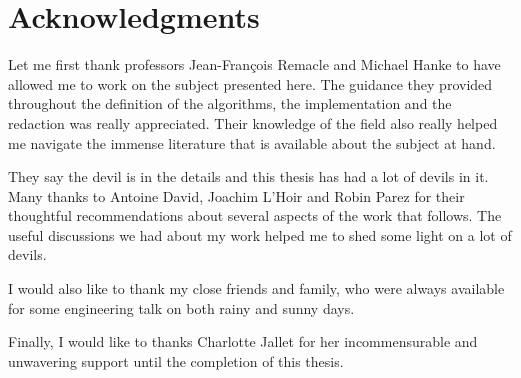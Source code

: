 \chapter*{Acknowledgments}

Let me first thank professors Jean-François Remacle and Michael Hanke to have allowed me to work on the subject presented here. The guidance they provided throughout the definition of the algorithms, the implementation and the redaction was really appreciated. Their knowledge of the field also really helped me navigate the immense literature that is available about the subject at hand. 


They say the devil is in the details and this thesis has had a lot of devils in it. Many thanks to Antoine David, Joachim L'Hoir and Robin Parez for their thoughtful recommendations about several aspects of the work that follows. The useful discussions we had about my work helped me to shed some light on a lot of devils.   

I would also like to thank my close friends and family, who were always available for some engineering talk on both rainy and sunny days. 

Finally, I would like to thanks Charlotte Jallet for her incommensurable and unwavering support until the completion of this thesis. 